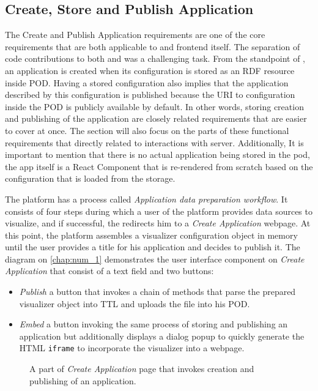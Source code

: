 \subsection{Create, Store and Publish Application}

The Create and Publish Application requirements are one of the core requirements that are both applicable to \lpas{} and \lpa{} frontend itself. The separation of code contributions to both \lpa{} and \lpas{} was a challenging task. From the standpoint of \lpas{}, an application is created when its configuration is stored as an RDF resource inside \solid{} POD. Having a stored configuration also implies that the application described by this configuration is published because the URI to configuration inside the POD is publicly available by default. In other words, storing creation and publishing of the application are closely related requirements that are easier to cover at once. The section will also focus on the parts of these functional requirements that directly related to interactions with \solid{} server. Additionally, It is important to mention that there is no actual application being stored in the \solid{} pod, the app itself is a React Component that is re-rendered from scratch based on the \lpa{} configuration that is loaded from the storage. 

The \lpa{} platform has a process called \textit{Application data preparation workflow}. It consists of four steps during which a user of the platform provides data sources to visualize, and if successful, the \lpa{} redirects him to a \textit{Create Application} webpage. At this point, the platform assembles a visualizer configuration object in memory until the user provides a title for his application and decides to publish it. The diagram on \autoref{chap:num_1} demonstrates the user interface component on \textit{Create Application} that consist of a text field and two buttons:
\begin{itemize}
    \item \textit{Publish} a button that invokes a chain of methods that parse the prepared visualizer object into TTL and uploads the file into his \solid{} POD.
    \item \textit{Embed} a button invoking the same process of storing and publishing an application but additionally displays a dialog popup to quickly generate the HTML \texttt{iframe} to incorporate the visualizer into a webpage.
\end{itemize}

\begin{figure}[h]
\centering
{}
\caption{A part of \textit{Create Application} page that invokes creation and publishing of an application.}
\label{fig:create_app_implementation_diagram}
\end{figure}

